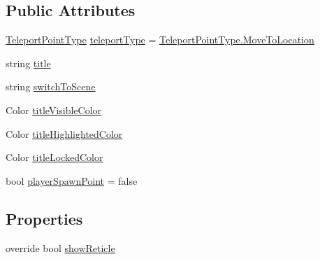 \subsection*{Public Attributes}
\begin{DoxyCompactItemize}
\item 
\mbox{\hyperlink{class_valve_1_1_v_r_1_1_interaction_system_1_1_teleport_point_a1a849ffcc7eea342470d494523085b57}{Teleport\+Point\+Type}} \mbox{\hyperlink{class_valve_1_1_v_r_1_1_interaction_system_1_1_teleport_point_a6833ee4b88d0fbd19dbc5b511565f1c5}{teleport\+Type}} = \mbox{\hyperlink{class_valve_1_1_v_r_1_1_interaction_system_1_1_teleport_point_a1a849ffcc7eea342470d494523085b57a16808f36574d3edac6f7fee3ac10dd28}{Teleport\+Point\+Type.\+Move\+To\+Location}}
\item 
string \mbox{\hyperlink{class_valve_1_1_v_r_1_1_interaction_system_1_1_teleport_point_add0bb364d611e45c9fb8595dcbcb50b5}{title}}
\item 
string \mbox{\hyperlink{class_valve_1_1_v_r_1_1_interaction_system_1_1_teleport_point_a3488a33dfefd1d62c04bd1d3faad5371}{switch\+To\+Scene}}
\item 
Color \mbox{\hyperlink{class_valve_1_1_v_r_1_1_interaction_system_1_1_teleport_point_acbfb78c77d89ff3fe945d0a66ecb2b4f}{title\+Visible\+Color}}
\item 
Color \mbox{\hyperlink{class_valve_1_1_v_r_1_1_interaction_system_1_1_teleport_point_ab7ad6e57d737fe2b6de74239bc65b0ae}{title\+Highlighted\+Color}}
\item 
Color \mbox{\hyperlink{class_valve_1_1_v_r_1_1_interaction_system_1_1_teleport_point_a23927294cd02fd994803e2890a3392bc}{title\+Locked\+Color}}
\item 
bool \mbox{\hyperlink{class_valve_1_1_v_r_1_1_interaction_system_1_1_teleport_point_a6396ed2600b2259386405117a0c4cfc0}{player\+Spawn\+Point}} = false
\end{DoxyCompactItemize}
\subsection*{Properties}
\begin{DoxyCompactItemize}
\item 
override bool \mbox{\hyperlink{class_valve_1_1_v_r_1_1_interaction_system_1_1_teleport_point_a60ec8edfadfd8307124d22d77102f2f9}{show\+Reticle}}
\end{DoxyCompactItemize}


